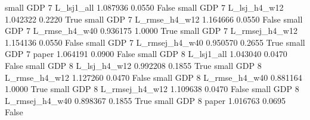      small      GDP                 7     L_lsj1_all   1.087936      0.0550   False
     small      GDP                 7   L_lsj_h4_w12   1.042322      0.2220    True
     small      GDP                 7  L_rmse_h4_w12   1.164666      0.0550   False
     small      GDP                 7  L_rmse_h4_w40   0.936175      1.0000    True
     small      GDP                 7 L_rmsej_h4_w12   1.154136      0.0550   False
     small      GDP                 7 L_rmsej_h4_w40   0.950570      0.2655    True
     small      GDP                 7          paper   1.064191      0.0900   False
     small      GDP                 8     L_lsj1_all   1.043040      0.0470   False
     small      GDP                 8   L_lsj_h4_w12   0.992208      0.1855    True
     small      GDP                 8  L_rmse_h4_w12   1.127260      0.0470   False
     small      GDP                 8  L_rmse_h4_w40   0.881164      1.0000    True
     small      GDP                 8 L_rmsej_h4_w12   1.109638      0.0470   False
     small      GDP                 8 L_rmsej_h4_w40   0.898367      0.1855    True
     small      GDP                 8          paper   1.016763      0.0695   False